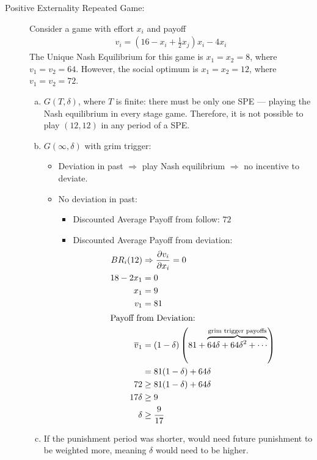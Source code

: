 \documentclass[8pt]{extarticle}
\begin{document}
  \begin{description}
    \item[Positive Externality Repeated Game:] Consider a game with effort $x_i$ and payoff
      \begin{align*}
        v_i = \left(16 - x_i + \frac{1}{2}x_j\right)x_i - 4x_i
      \end{align*}
      The Unique Nash Equilibrium for this game is $x_1 = x_2 = 8$, where $v_1 = v_2 = 64$. However, the social optimum is $x_1 = x_2 = 12$, where $v_1 = v_2 = 72$.
      \begin{enumerate}[(a)]
        \item $G(T,\delta)$, where $T$ is finite: there must be only one SPE --- playing the Nash equilibrium in every stage game. Therefore, it is not possible to play $(12,12)$ in any period of a SPE.
        \item $G(\infty,\delta)$ with grim trigger:
          \begin{itemize}
            \item Deviation in past $\Rightarrow$ play Nash equilibrium $\Rightarrow$ no incentive to deviate.
            \item No deviation in past:
              \begin{itemize}
                \item Discounted Average Payoff from follow: $72$
                \item Discounted Average Payoff from deviation:
                  \begin{align*}
                    BR_{i}(12) &\Rightarrow \frac{\partial v_i}{\partial x_i} = 0\\
                    18 - 2x_1 &= 0\\
                    x_1 &= 9\\
                    v_1 &= 81\\
                    \shortintertext{Payoff from Deviation:}
                    \overline{v}_1 &= \left(1-\delta\right)\left(81 + \overbrace{64\delta + 64\delta^2 + \cdots}^{\text{grim trigger payoffs}}\right)\\
                                   &= 81(1-\delta) + 64\delta\\
                    72 &\geq 81(1-\delta) + 64\delta\\
                    17\delta &\geq 9\\
                    \delta &\geq \frac{9}{17}
                  \end{align*}
              \end{itemize}
          \end{itemize}
        \item If the punishment period was shorter, would need future punishment to be weighted more, meaning $\delta$ would need to be higher.
      \end{enumerate}
  \end{description}
\end{document}
